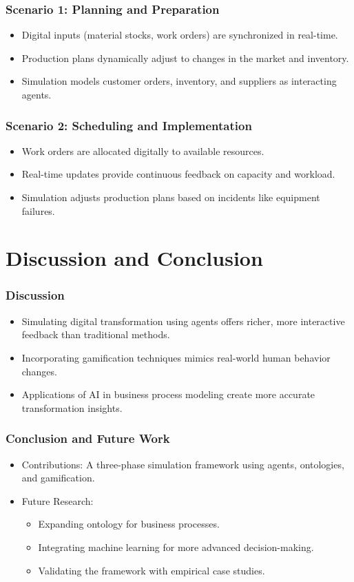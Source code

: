 \begin{frame}
    \frametitle{Scenario 1: Planning and Preparation}
    \begin{itemize}
        \item Digital inputs (material stocks, work orders) are synchronized in real-time.
        \item Production plans dynamically adjust to changes in the market and inventory.
        \item Simulation models customer orders, inventory, and suppliers as interacting agents.
    \end{itemize}
\end{frame}

\begin{frame}
    \frametitle{Scenario 2: Scheduling and Implementation}
    \begin{itemize}
        \item Work orders are allocated digitally to available resources.
        \item Real-time updates provide continuous feedback on capacity and workload.
        \item Simulation adjusts production plans based on incidents like equipment failures.
    \end{itemize}
\end{frame}

\section{Discussion and Conclusion}

\begin{frame}
    \frametitle{Discussion}
    \begin{itemize}
        \item Simulating digital transformation using agents offers richer, more interactive feedback than traditional methods.
        \item Incorporating gamification techniques mimics real-world human behavior changes.
        \item Applications of AI in business process modeling create more accurate transformation insights.
    \end{itemize}
\end{frame}

\begin{frame}
    \frametitle{Conclusion and Future Work}
    \begin{itemize}
        \item Contributions: A three-phase simulation framework using agents, ontologies, and gamification.
        \item Future Research:
        \begin{itemize}
            \item Expanding ontology for business processes.
            \item Integrating machine learning for more advanced decision-making.
            \item Validating the framework with empirical case studies.
        \end{itemize}
    \end{itemize}
\end{frame}
